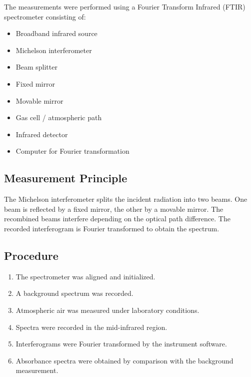 The measurements were performed using a Fourier Transform Infrared (FTIR) spectrometer consisting of:

\begin{itemize}
    \item Broadband infrared source
    \item Michelson interferometer
    \item Beam splitter
    \item Fixed mirror
    \item Movable mirror
    \item Gas cell / atmospheric path
    \item Infrared detector
    \item Computer for Fourier transformation
\end{itemize}


\subsection{Measurement Principle}

The Michelson interferometer splits the incident radiation into two beams. One beam is reflected by a fixed mirror, the other by a movable mirror. The recombined beams interfere depending on the optical path difference.
The recorded interferogram is Fourier transformed to obtain the spectrum.

\subsection{Procedure}

\begin{enumerate}
    \item The spectrometer was aligned and initialized.
    \item A background spectrum was recorded.
    \item Atmospheric air was measured under laboratory conditions.
    \item Spectra were recorded in the mid-infrared region.
    \item Interferograms were Fourier transformed by the instrument software.
    \item Absorbance spectra were obtained by comparison with the background measurement.
\end{enumerate}

\newpage
